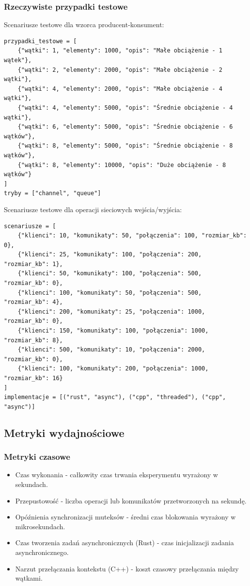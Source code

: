 \subsubsection{Rzeczywiste przypadki testowe}
Scenariusze testowe dla wzorca producent-konsument:
\small
\begin{verbatim}
przypadki_testowe = [
    {"wątki": 1, "elementy": 1000, "opis": "Małe obciążenie - 1 wątek"},
    {"wątki": 2, "elementy": 2000, "opis": "Małe obciążenie - 2 wątki"}, 
    {"wątki": 4, "elementy": 2000, "opis": "Małe obciążenie - 4 wątki"},
    {"wątki": 4, "elementy": 5000, "opis": "Średnie obciążenie - 4 wątki"},
    {"wątki": 6, "elementy": 5000, "opis": "Średnie obciążenie - 6 wątków"},
    {"wątki": 8, "elementy": 5000, "opis": "Średnie obciążenie - 8 wątków"},
    {"wątki": 8, "elementy": 10000, "opis": "Duże obciążenie - 8 wątków"}
]
tryby = ["channel", "queue"]
\end{verbatim}
\normalsize
Scenariusze testowe dla operacji sieciowych wejścia/wyjścia:
\small
\begin{verbatim}
scenariusze = [
    {"klienci": 10, "komunikaty": 50, "połączenia": 100, "rozmiar_kb": 0},
    {"klienci": 25, "komunikaty": 100, "połączenia": 200, "rozmiar_kb": 1},
    {"klienci": 50, "komunikaty": 100, "połączenia": 500, "rozmiar_kb": 0},
    {"klienci": 100, "komunikaty": 50, "połączenia": 500, "rozmiar_kb": 4},
    {"klienci": 200, "komunikaty": 25, "połączenia": 1000, "rozmiar_kb": 0},
    {"klienci": 150, "komunikaty": 100, "połączenia": 1000, "rozmiar_kb": 8},
    {"klienci": 500, "komunikaty": 10, "połączenia": 2000, "rozmiar_kb": 0},
    {"klienci": 100, "komunikaty": 200, "połączenia": 1000, "rozmiar_kb": 16}
]
implementacje = [("rust", "async"), ("cpp", "threaded"), ("cpp", "async")]
\end{verbatim}
\normalsize
\subsection{Metryki wydajnościowe}

\subsubsection{Metryki czasowe}
\begin{itemize}
    \item Czas wykonania - całkowity czas trwania eksperymentu wyrażony w sekundach.
    \item Przepustowość - liczba operacji lub komunikatów przetworzonych na sekundę.
    \item Opóźnienia synchronizacji muteksów - średni czas blokowania wyrażony w mikrosekundach.
    \item Czas tworzenia zadań asynchronicznych (Rust) - czas inicjalizacji zadania asynchronicznego.
    \item Narzut przełączania kontekstu (C++) - koszt czasowy przełączania między wątkami.
\end{itemize}

